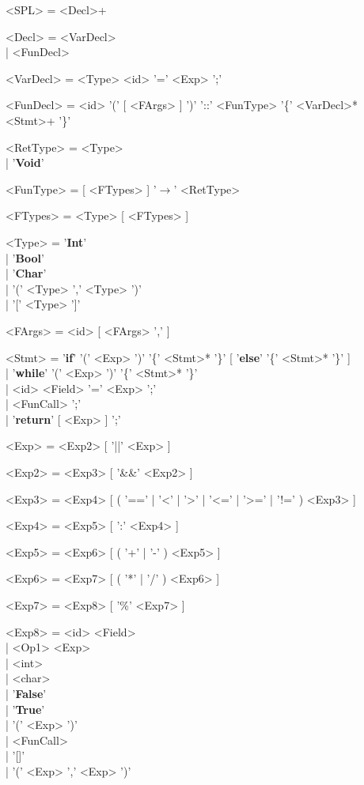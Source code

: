 \documentclass{article}
\begin{document}
\begin{grammar}
<SPL> = <Decl>+

<Decl> = <VarDecl> \\| <FunDecl>

<VarDecl> = <Type> <id> '=' <Exp> ';'

<FunDecl> = <id> '(' [ <FArgs> ] ')' '::' <FunType> '\{' <VarDecl>* <Stmt>+ '\}'

<RetType> = <Type> \\| '\textbf{Void}'

<FunType> = [ <FTypes> ] '$\rightarrow$' <RetType>

<FTypes> = <Type> [ <FTypes> ]

<Type> = '\textbf{Int}' \\| '\textbf{Bool}' \\| '\textbf{Char}' \\| '(' <Type> ',' <Type> ')' \\| '[' <Type> ']'

<FArgs> = <id> [ <FArgs> ',' ]

<Stmt> = '\textbf{if}' '(' <Exp> ')' '\{' <Stmt>* '\}' [ '\textbf{else}' '\{' <Stmt>* '\}' ] \\| '\textbf{while}' '(' <Exp> ')' '\{' <Stmt>* '\}' \\| <id> <Field> '=' <Exp> ';' \\| <FunCall> ';' \\| '\textbf{return}' [ <Exp> ] ';'

<Exp> = <Exp2> [ '||' <Exp> ]

<Exp2> = <Exp3> [ '\&\&' <Exp2> ]

<Exp3> = <Exp4> [ ( '==' | '\textless' | '\textgreater' | '\textless=' | '\textgreater=' | '!=' ) <Exp3> ]

<Exp4> = <Exp5> [ ':' <Exp4> ]

<Exp5> = <Exp6> [ ( '+' | '-' ) <Exp5> ]

<Exp6> = <Exp7> [ ( '*' | '/' ) <Exp6> ]

<Exp7> = <Exp8> [ '\%' <Exp7> ]

<Exp8> = <id> <Field> \\| <Op1> <Exp> \\| <int> \\| <char> \\| '\textbf{False}' \\| '\textbf{True}' \\| '(' <Exp> ')' \\| <FunCall> \\| '[]' \\| '(' <Exp> ',' <Exp> ')'


\end{grammar}
\end{document}
